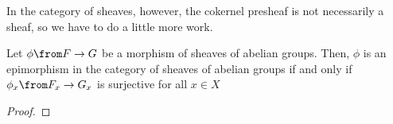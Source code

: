 \documentclass[11pt,leqno,oneside]{amsbook}
\renewcommand{\F}{F} %
\newcommand{\G}{G}
\numberwithin{thm}{section}
\begin{document}
In the category of sheaves, however, the cokernel presheaf is not
necessarily a sheaf, so we have to do a little more work.
\begin{prop}
  Let \(\phi \from \F \to \G\) be a morphism of sheaves of abelian
  groups. Then, \(\phi\) is an epimorphism in the category of sheaves of
    abelian groups if and only if \(\phi_x \from \F_x \to \G_x\) is surjective for all \(x \in X\)
  \end{prop}
  \begin{proof}
    
  \end{proof}
\begin{bibdiv}
  \begin{biblist}
  \end{biblist}
\end{bibdiv}
\end{document}
